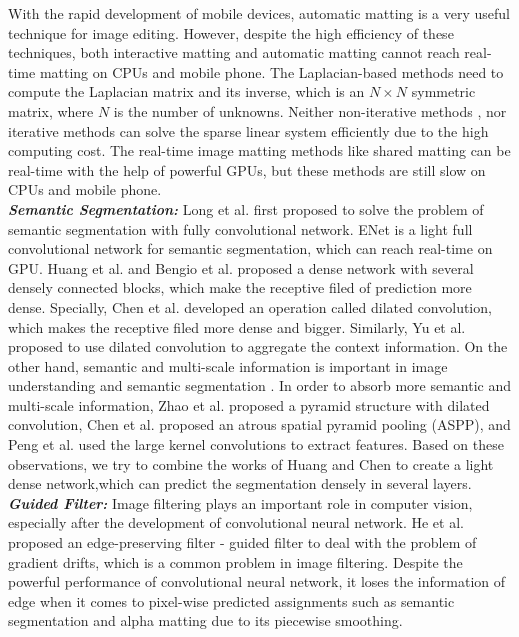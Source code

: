 \documentclass[sigconf]{acmart}
\begin{document}
With the rapid development of mobile devices, automatic matting is a very useful technique for image editing. However, despite the high efficiency of these techniques, both interactive matting and automatic matting cannot reach real-time matting on CPUs and mobile phone. The Laplacian-based methods need to compute the Laplacian matrix and its inverse, which is an $N \times N$ symmetric matrix, where $N$ is the number of unknowns. Neither non-iterative methods \cite{levin2008closed}, nor iterative methods \cite{he2010fast} can solve the sparse linear system efficiently due to the high computing cost. The real-time image matting methods like shared matting can be real-time with the help of powerful GPUs, but these methods are still slow on CPUs and mobile phone. \\
\textbf{\emph{Semantic Segmentation:}} Long et al. \cite{long2015fully} first proposed to solve the problem of semantic segmentation with fully convolutional network. ENet \cite{paszke2016enet} is a light full convolutional network for semantic segmentation, which can reach real-time on GPU. Huang et al. \cite{huang2016densely} and Bengio et al. \cite{Jgou2016TheOH} proposed a dense network with several densely connected blocks, which make the receptive filed of prediction more dense. Specially, Chen et al. \cite{chen2014semantic} developed an operation called dilated convolution, which makes the receptive filed more dense and bigger. Similarly, Yu et al. \cite{yu2015multi} proposed to use dilated convolution to aggregate the context information. On the other hand, semantic and multi-scale information is important in image understanding and semantic segmentation \cite{Wang2008AMS,Wang2014BilayerST,Zhou2016SemanticUO,Handa2015SceneNetUR}. In order to absorb more semantic and multi-scale information, Zhao et al. \cite{zhao2016pyramid} proposed a pyramid structure with dilated convolution, Chen et al. \cite{Chen2017DeepLabSI} proposed an atrous spatial pyramid pooling (ASPP), and Peng et al. \cite{Peng2017LargeKM} used the large kernel convolutions to extract features. Based on these observations, we try to combine the works of Huang \cite{huang2016densely} and Chen \cite{chen2014semantic} to create a light dense network,which can predict the segmentation densely in several layers. \\
\textbf{\emph{Guided Filter:}} Image filtering plays an important role in computer vision, especially after the development of convolutional neural network. He et al. \cite{he2013guided} proposed an edge-preserving filter - guided filter to deal with the problem of gradient drifts, which is a common problem in image filtering. Despite the powerful performance of convolutional neural network, it loses the information of edge when it comes to pixel-wise predicted assignments such as semantic segmentation and alpha matting due to its piecewise smoothing.
\end{document}
